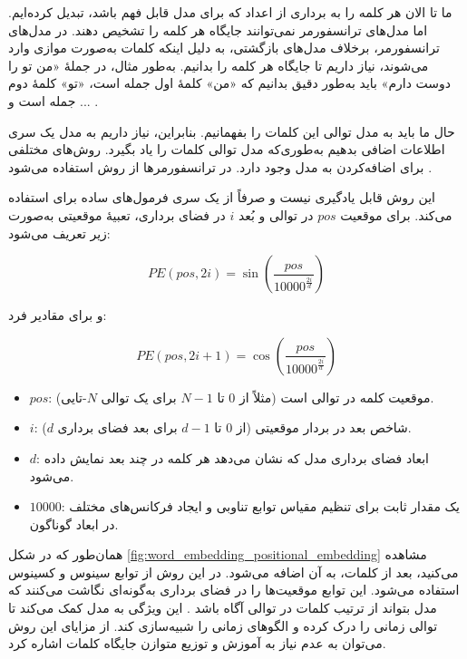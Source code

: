 ما تا الان هر کلمه را به برداری از اعداد که برای مدل قابل فهم باشد، تبدیل کرده‌ایم. اما مدل‌های ترانسفورمر نمی‌توانند جایگاه هر کلمه را تشخیص دهند. در مدل‌های ترانسفورمر، برخلاف مدل‌های بازگشتی، به دلیل اینکه کلمات به‌صورت موازی وارد می‌شوند، نیاز داریم تا جایگاه هر کلمه را بدانیم. به‌طور مثال، در جملهٔ «من تو را دوست دارم» باید به‌طور دقیق بدانیم که «من» کلمهٔ اول جمله است، «تو» کلمهٔ دوم جمله است و ... .

حال ما باید به مدل توالی این کلمات را بفهمانیم. بنابراین، نیاز داریم به مدل یک سری اطلاعات اضافی بدهیم به‌طوری‌که مدل توالی کلمات را یاد بگیرد. روش‌های مختلفی برای اضافه‌کردن  به مدل وجود دارد. در ترانسفورمرها از روش  استفاده می‌شود \cite{vaswani2017attention}.

این روش قابل یادگیری نیست و صرفاً از یک سری فرمول‌های ساده برای  استفاده می‌کند.  
برای موقعیت \( pos \) در توالی و بُعد \( i \) در فضای برداری، تعبیهٔ موقعیتی به‌صورت زیر تعریف می‌شود:  


\begin{equation}
	PE(pos, 2i) = \sin\left( \frac{pos}{10000^{\frac{2i}{d}}} \right)
	\label{eq:pe_even}
\end{equation}

و برای مقادیر فرد:  

\begin{equation}
	PE(pos, 2i+1) = \cos\left( \frac{pos}{10000^{\frac{2i}{d}}} \right)
	\label{eq:pe_odd}
\end{equation}
	



\begin{itemize}
	\item \( pos \): موقعیت کلمه در توالی است (مثلاً از \( 0 \) تا \( N-1 \) برای یک توالی \( N \)-تایی).
	\item \( i \): شاخص بعد در بردار موقعیتی (از \( 0 \) تا \( d-1 \) برای بعد فضای برداری \( d \)).
	\item \( d \): ابعاد فضای برداری مدل که نشان می‌دهد هر کلمه در چند بعد نمایش داده می‌شود.
	\item \( 10000 \): یک مقدار ثابت برای تنظیم مقیاس توابع تناوبی و ایجاد فرکانس‌های مختلف در ابعاد گوناگون.
\end{itemize}  

همان‌طور که در شکل \autoref{fig:word_embedding_positional_embedding} مشاهده می‌کنید، بعد از  کلمات، به آن  اضافه می‌شود. در این روش از توابع سینوس و کسینوس استفاده می‌شود. این توابع موقعیت‌ها را در فضای برداری به‌گونه‌ای نگاشت می‌کنند که مدل بتواند از ترتیب کلمات در توالی آگاه باشد \cite{vaswani2017attention}. این ویژگی به مدل کمک می‌کند تا توالی زمانی را درک کرده و الگوهای زمانی را شبیه‌سازی کند. از مزایای این روش می‌توان به عدم نیاز به آموزش و توزیع متوازن جایگاه کلمات اشاره کرد.

